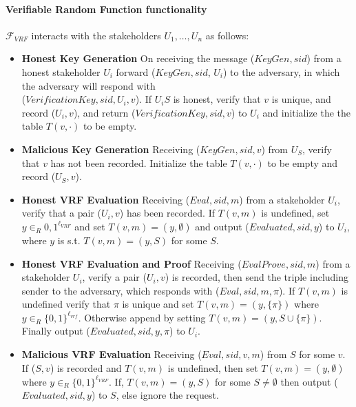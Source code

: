 \paragraph{Verifiable Random Function functionality} $\mathcal{F}_{VRF}$ interacts with the stakeholders $U_1, \dots, U_n$ as follows:
\begin{itemize}
    \item \textbf{Honest Key Generation} On receiving the message ($KeyGen, sid$) from a honest stakeholder $U_i$ forward ($KeyGen, sid$, $U_i$) to the adversary, in which the adversary will respond with \\ ($VerificationKey, sid, U_i, v$). If $U_iS$ is honest, verify that $v$ is unique, and record ($U_i, v$), and return ($VerificationKey, sid, v$) to $U_i$ and initialize the the table $T(v, \cdot)$ to be empty.
    
    \item \textbf{Malicious Key Generation} Receiving ($KeyGen, sid, v$) from $U_S$, verify that $v$ has not been recorded. Initialize the table $T(v, \cdot)$ to be empty and record ($U_S,v$).
    
    \item \textbf{Honest VRF Evaluation} Receiving ($Eval, sid, m$) from a stakeholder $U_i$, verify that a pair ($U_i, v$) has been recorded. If $T(v,m)$ is undefined, set $y \in_R {0,1}^{\ell_{VRF}}$ and set $T(v,m) = (y, \emptyset)$ and output ($Evaluated, sid, y$) to $U_i$, where $y$ is s.t. $T(v,m) = (y,S)$ for some $S$.
    
    \item \textbf{Honest VRF Evaluation and Proof} Receiving ($EvalProve, sid, m$) from a stakeholder $U_i$, verify a pair ($U_i, v$) is recorded, then send the triple including sender to the adversary, which responds with ($Eval, sid, m, \pi$). If $T(v,m)$ is undefined verify that $\pi$ is unique and set $T(v, m) = (y,\{ \pi \})$ where $y \in_R \{0,1\}^{\ell_{vrf}}$. Otherwise append by setting $T(v,m) = (y, S \cup \{ \pi \})$. Finally output ($Evaluated, sid, y, \pi$) to $U_i$.
    
    \item \textbf{Malicious VRF Evaluation} Receiving ($Eval, sid, v, m$) from $S$ for some $v$. If ($S,v$) is recorded and $T(v, m)$ is undefined, then set $T(v,m) = (y, \emptyset)$ where $y \in_R \{0,1\}^{\ell_{VRF}}$. If, $T(v,m) = (y,S)$ for some $S \not= \emptyset$ then output ($Evaluated, sid, y$) to $S$, else ignore the request.
    

\end{itemize}
